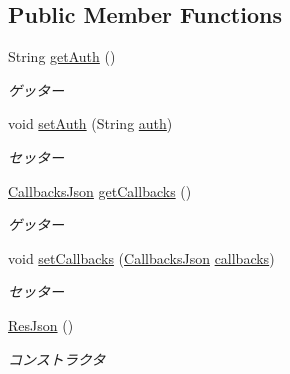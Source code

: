 \subsection*{Public Member Functions}
\begin{DoxyCompactItemize}
\item 
String \hyperlink{classjp_1_1gr_1_1java__conf_1_1yuta__yoshinaga_1_1reversi_1_1model_1_1_res_json_ae9ce58a56ca0b5302efb00692e1e78d4}{get\+Auth} ()
\begin{DoxyCompactList}\small\item\em ゲッター \end{DoxyCompactList}\item 
void \hyperlink{classjp_1_1gr_1_1java__conf_1_1yuta__yoshinaga_1_1reversi_1_1model_1_1_res_json_aec94a5246bf7245af19f8f72100e986c}{set\+Auth} (String \hyperlink{classjp_1_1gr_1_1java__conf_1_1yuta__yoshinaga_1_1reversi_1_1model_1_1_res_json_a025a6255e8c44b7a6c1e1503e1195e84}{auth})
\begin{DoxyCompactList}\small\item\em セッター \end{DoxyCompactList}\item 
\hyperlink{classjp_1_1gr_1_1java__conf_1_1yuta__yoshinaga_1_1reversi_1_1model_1_1_callbacks_json}{Callbacks\+Json} \hyperlink{classjp_1_1gr_1_1java__conf_1_1yuta__yoshinaga_1_1reversi_1_1model_1_1_res_json_a1bd6cdcfb3ea59616409b5aae1d408e2}{get\+Callbacks} ()
\begin{DoxyCompactList}\small\item\em ゲッター \end{DoxyCompactList}\item 
void \hyperlink{classjp_1_1gr_1_1java__conf_1_1yuta__yoshinaga_1_1reversi_1_1model_1_1_res_json_a2c93a1f6a03a04909da59238c7e68ca3}{set\+Callbacks} (\hyperlink{classjp_1_1gr_1_1java__conf_1_1yuta__yoshinaga_1_1reversi_1_1model_1_1_callbacks_json}{Callbacks\+Json} \hyperlink{classjp_1_1gr_1_1java__conf_1_1yuta__yoshinaga_1_1reversi_1_1model_1_1_res_json_a39c4406106b7bfae1aeb9c56f4a51f46}{callbacks})
\begin{DoxyCompactList}\small\item\em セッター \end{DoxyCompactList}\item 
\hyperlink{classjp_1_1gr_1_1java__conf_1_1yuta__yoshinaga_1_1reversi_1_1model_1_1_res_json_ac67902ff0ff40d4b25e3ded78b5098a2}{Res\+Json} ()
\begin{DoxyCompactList}\small\item\em コンストラクタ \end{DoxyCompactList}\end{DoxyCompactItemize}
